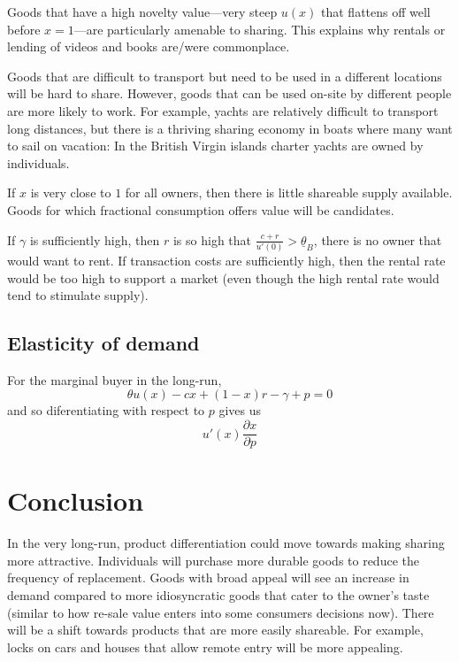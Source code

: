\documentclass[11pt]{article}
\begin{document}
Goods that have a high novelty value---very steep $u(x)$ that flattens off well before $x = 1$---are particularly amenable to sharing. 
This explains why rentals or lending of videos and books are/were commonplace.  

Goods that are difficult to transport but need to be used in a different locations will be hard to share. 
However, goods that can be used on-site by different people are more likely to work. 
For example, yachts are relatively difficult to transport long distances, but there is a thriving sharing economy in boats where many want to sail on vacation: 
In the British Virgin islands charter yachts are owned by individuals. 

If $x$ is very close to $1$ for all owners, then there is little shareable supply available. 
Goods for which fractional consumption offers value will be candidates. 

If $\gamma$ is sufficiently high, then $r$ is so high that 
$\frac{c + r}{u'(0)} > \underline{\theta}_B$, there is no owner that would want to rent. 
If transaction costs are sufficiently high, then the rental rate would be too high to support a market (even though the high rental rate would tend to stimulate supply). 

\subsection{Elasticity of demand} 

For the marginal buyer in the long-run, 
\begin{equation}
\theta u(x) - c x + (1-x)r - \gamma + p = 0 
\end{equation} 
and so diferentiating with respect to $p$ gives us
\begin{equation}
u'(x)\frac{\partial x}{\partial p} 
\end{equation} 

\section{Conclusion}
In the very long-run, product differentiation could move towards making sharing more attractive. 
Individuals will purchase more durable goods to reduce the frequency of replacement. 
Goods with broad appeal will see an increase in demand compared to more idiosyncratic goods that cater to the owner's taste (similar to how re-sale value enters into some consumers decisions now). 
There will be a shift towards products that are more easily shareable. 
For example, locks on cars and houses that allow remote entry will be more appealing. 
\end{document}
